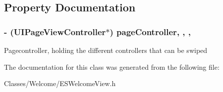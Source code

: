 \subsection{Property Documentation}
\hypertarget{interface_e_s_welcome_view_a69af5615bf254612f5ce393ad01a88d6}{}
\subsubsection[{page\+Controller}]{\setlength{\rightskip}{0pt plus 5cm}-\/ (U\+I\+Page\+View\+Controller$\ast$) page\+Controller\hspace{0.3cm}{\ttfamily [read]}, {\ttfamily [write]}, {\ttfamily [nonatomic]}, {\ttfamily [strong]}}\label{interface_e_s_welcome_view_a69af5615bf254612f5ce393ad01a88d6}
Pagecontroller, holding the different controllers that can be swiped 

The documentation for this class was generated from the following file\+:\begin{DoxyCompactItemize}
\item 
Classes/\+Welcome/E\+S\+Welcome\+View.\+h\end{DoxyCompactItemize}
